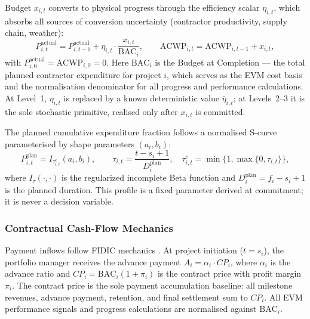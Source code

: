 Budget $x_{i,t}$ converts to physical progress through the efficiency
scalar $\eta_{i,t}$, which absorbs all sources of conversion uncertainty
(contractor productivity, supply chain, weather):
\begin{equation}
  P_{i,t}^{\mathrm{actual}}
    = P_{i,t-1}^{\mathrm{actual}}
      + \eta_{i,t} \cdot \frac{x_{i,t}}{\mathrm{BAC}_i},
  \qquad
  \mathrm{ACWP}_{i,t} = \mathrm{ACWP}_{i,t-1} + x_{i,t},
  \label{eq:progress_rec}
\end{equation}
with $P_{i,0}^{\mathrm{actual}} = \mathrm{ACWP}_{i,0} = 0$. Here
$\mathrm{BAC}_i$ is the Budget at Completion --- the total planned
contractor expenditure for project $i$, which serves as the EVM cost
basis and the normalisation denominator for all progress and performance
calculations. At Level~1, $\eta_{i,t}$ is replaced by a known
deterministic value $\bar{\eta}_{i,t}$; at Levels~2--3 it is the
sole stochastic primitive, realised only after $x_{i,t}$ is committed.

The planned cumulative expenditure fraction follows a normalised S-curve
\citep{Kenley2009, barraza2004probabilistic} parameterised by shape
parameters $(a_i, b_i)$:
\begin{equation}
  P_{i,t}^{\mathrm{plan}}
    = I_{\tau_{i,t}^c}(a_i, b_i),
  \qquad
  \tau_{i,t} = \frac{t - s_i + 1}{D_i^{\mathrm{plan}}},
  \quad
  \tau_{i,t}^c = \min\{1,\max\{0,\tau_{i,t}\}\},
  \label{eq:scurve}
\end{equation}
where $I_\tau(\cdot,\cdot)$ is the regularized incomplete Beta function
and $D_i^{\mathrm{plan}} = f_i - s_i + 1$ is the planned duration. This
profile is a fixed parameter derived at commitment; it is never a decision
variable.

\subsubsection{Contractual Cash-Flow Mechanics}
\label{subsubsec:cashflow}

Payment inflows follow FIDIC mechanics \citep{FIDIC2017}. At project
initiation ($t = s_i$), the portfolio manager receives the advance payment
$A_i = \alpha_i \cdot CP_i$, where $\alpha_i$ is the advance ratio and
$CP_i = \mathrm{BAC}_i(1+\pi_i)$ is the contract price with profit margin
$\pi_i$. The contract price is the sole payment accumulation baseline:
all milestone revenues, advance payment, retention, and final settlement
sum to $CP_i$. All EVM performance signals and progress calculations are
normalised against $\mathrm{BAC}_i$.

